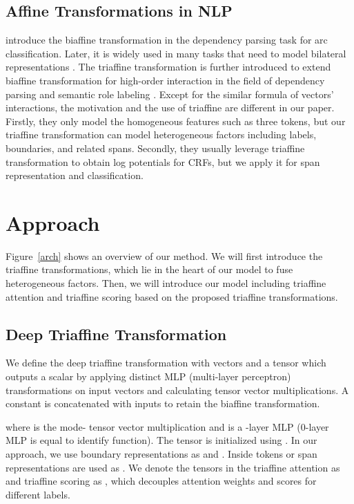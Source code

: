 \documentclass[11pt]{article}
\begin{document}
\subsection{Affine Transformations in NLP}
\citet{dozat2016deep} introduce the biaffine transformation in the dependency parsing task for arc classification. Later, it is widely used in many tasks that need to model bilateral representations \cite{li2019dependency,yu2020named}.
The triaffine transformation is further introduced to extend biaffine transformation for high-order interaction in the field of dependency parsing \cite{wang2019second,zhang2020efficient} and semantic role labeling \cite{li2020high}. Except for the similar formula of vectors' interactions, the motivation and the use of triaffine are different in our paper.
Firstly, they only model the homogeneous features such as three tokens, but our triaffine transformation can model heterogeneous factors including labels, boundaries, and related spans. Secondly, they usually leverage triaffine transformation to obtain log potentials for CRFs, but we apply it for span representation and classification.





\section{Approach}

Figure~\ref{arch} shows an overview of our method. We will first introduce the triaffine transformations, which lie in the heart of our model to fuse heterogeneous factors. Then, we will introduce our model including triaffine attention and triaffine scoring based on the proposed triaffine transformations.





\subsection{Deep Triaffine Transformation}
We define the deep triaffine transformation with vectors  and a tensor  which outputs a scalar by applying distinct MLP (multi-layer perceptron) transformations on input vectors and calculating tensor vector multiplications. A constant  is concatenated with inputs to retain the biaffine transformation.

where  is the mode- tensor vector multiplication and  is a -layer MLP (0-layer MLP is equal to identify function).
The tensor  is initialized using .
In our approach, we use boundary representations as  and . Inside tokens or span representations are used as .
We denote the tensors in the triaffine attention as  and triaffine scoring as , which decouples attention weights and scores for different labels.
\end{document}

